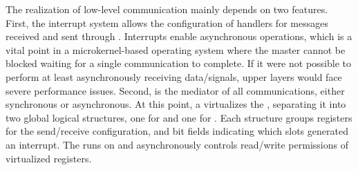 

			The realization of low-level communication mainly depends on two \mppa features. First, the interrupt system allows the configuration of handlers for messages received and sent through \noc. Interrupts enable asynchronous operations, which is a vital point in a microkernel-based operating system where the master cannot be blocked waiting for a single communication to complete. If it were not possible to perform at least asynchronously receiving data/signals, upper layers would face severe performance issues. Second, \dma is the mediator of all communications, either synchronous or asynchronous. At this point, a \hypervisor virtualizes the \dma, separating it into two global logical structures, one for \cnoc and one for \dnoc. Each structure groups registers for the send/receive configuration, and bit fields indicating which slots generated an interrupt. The \hypervisor runs on \rms and asynchronously controls read/write permissions of virtualized registers.

